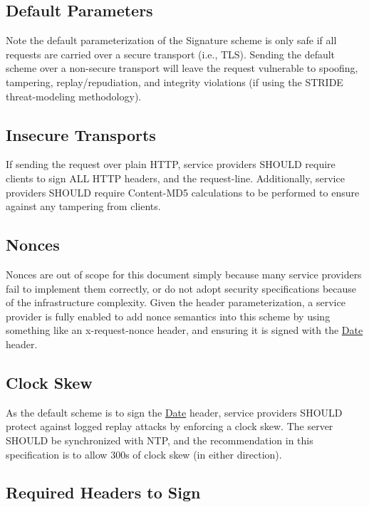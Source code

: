 \subsection*{Default Parameters}

Note the default parameterization of the {\ttfamily Signature} scheme is only safe if all requests are carried over a secure transport (i.\+e., T\+LS). Sending the default scheme over a non-\/secure transport will leave the request vulnerable to spoofing, tampering, replay/repudiation, and integrity violations (if using the S\+T\+R\+I\+DE threat-\/modeling methodology).

\subsection*{Insecure Transports}

If sending the request over plain H\+T\+TP, service providers S\+H\+O\+U\+LD require clients to sign A\+LL H\+T\+TP headers, and the {\ttfamily request-\/line}. Additionally, service providers S\+H\+O\+U\+LD require {\ttfamily Content-\/\+M\+D5} calculations to be performed to ensure against any tampering from clients.

\subsection*{Nonces}

Nonces are out of scope for this document simply because many service providers fail to implement them correctly, or do not adopt security specifications because of the infrastructure complexity. Given the {\ttfamily header} parameterization, a service provider is fully enabled to add nonce semantics into this scheme by using something like an {\ttfamily x-\/request-\/nonce} header, and ensuring it is signed with the {\ttfamily \mbox{\hyperlink{classDate}{Date}}} header.

\subsection*{Clock Skew}

As the default scheme is to sign the {\ttfamily \mbox{\hyperlink{classDate}{Date}}} header, service providers S\+H\+O\+U\+LD protect against logged replay attacks by enforcing a clock skew. The server S\+H\+O\+U\+LD be synchronized with N\+TP, and the recommendation in this specification is to allow 300s of clock skew (in either direction).

\subsection*{Required Headers to Sign}

